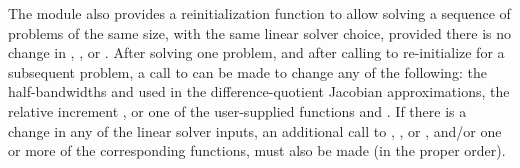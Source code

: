The {\cvbbdpre} module also provides a reinitialization function to allow
solving a sequence of problems of the same size, with the same linear solver
choice, provided there is no change in , , or .
After solving one problem, and after calling  to
re-initialize {\cvode} for a subsequent problem, a call to 
can be made to change any of the following: the half-bandwidths  and
 used in the difference-quotient Jacobian approximations, the relative
increment , or one of the user-supplied functions  and .
If there is a change in any of the linear solver inputs, an additional call
to , , or , and/or one or more of
the corresponding  functions, must also be made (in the proper order).

